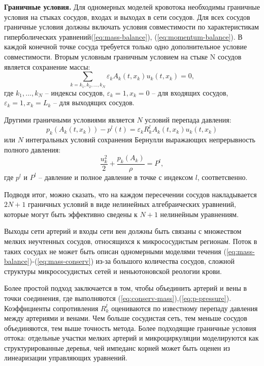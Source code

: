 {\bf Граничные условия.}
Для одномерных моделей кровотока необходимы граничные условия на стыках сосудов, входах и выходах в сети сосудов. 
Для всех сосудов граничные условия должны включать условия совместимости по характеристикам гиперболических уравнений(\ref{eq:mass-balance}), (\ref{eq:momentum-balance}).
В каждой конечной точке сосуда требуется только одно дополнительное условие совместимости.
Вторым условным граничным условием на стыке N сосудов является сохранение массы:
\begin{equation}
    \label{eq:conserv-mass}
    \sum_{k=k_1,k_2,...,k_N} \varepsilon_k A_k(t,x_k)u_k(t,x_k)=0,
\end{equation}
где {$k_1,...,k_N$} -- индексы сосудов, $\varepsilon_k=1, x_k=0$ -- для входящих сосудов, 
$\varepsilon_k=1, x_k=L_k$ -- для выходящих сосудов.

Другими граничными условиями является $N$ условий перепада давления:
\begin{equation}
    \label{eq:p-pressure}
    p_k\left(A_k\left(t,x_k\right)\right)-p^l(t)=\varepsilon_k R^l_k A_k(t,x_k)u_k(t,x_k)
\end{equation}
или $N$ интегральных условий сохранения Бернулли выражающих непрерывность полного давления:
\begin{equation}
    \label{eq:bernulli}
    \frac{u^2_k}{2}+\frac{p_k(A_k)}{\rho}=P^l,
\end{equation}
где $p^l$ и $P^l$ -- давление и полное давление в точке с индексом $l$, соответсвенно.

Подводя итог, можно сказать, что на каждом пересечении сосудов накладывается $2N + 1 $ граничных условий в виде 
нелинейных алгебраических уравнений, которые могут быть эффективно сведены к $N + 1$ нелинейным уравнениям.

Выходы сети артерий и входы сети вен должны быть связаны с множеством мелких неучтенных сосудов, относящихся к микрососудистым регионам.
 Поток в таких сосудах не может быть описан одномерными моделями течения (\ref{eq:mass-balance})-(\ref{eq:mass-conserv}) 
 из-за большого количества сосудов, сложной структуры микрососудистых сетей и неньютоновской реологии крови.

Более простой подход заключается в том, чтобы объединить артерий и вены в точки соединения, 
где выполняются (\ref{eq:conserv-mass}),(\ref{eq:p-pressure}). Коэффициенты сопротивления $ R^l_k$ оцениваются  по известному перепаду 
давления между артериями и венами. Чем больше сосудистая сеть, тем меньше сосудов объединяются, тем выше точность метода. 
Более подходящие граничные условия оттока: отдельные участки мелких артерий и микроциркуляции моделируются как структурированные деревья, 
чей импеданс корней может быть оценен из линеаризации управляющих уравнений.

